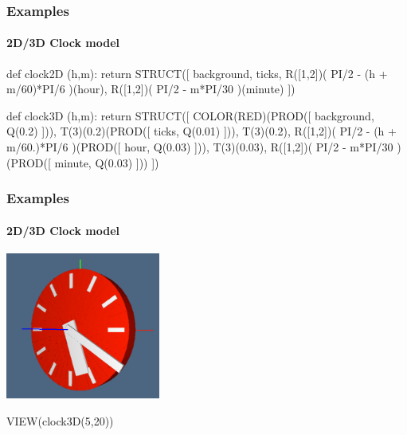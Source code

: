 \documentclass{beamer}
\begin{document}
\begin{frame}[fragile]\frametitle{Examples}
\framesubtitle{2D/3D Clock model}

\vfill


\begin{python}
def clock2D (h,m):
    return STRUCT([ background, ticks,
	    R([1,2])( PI/2 - (h + m/60)*PI/6 )(hour),
	    R([1,2])( PI/2 - m*PI/30 )(minute) ])
\end{python}


\begin{python}
def clock3D (h,m):
    return STRUCT([  
    	COLOR(RED)(PROD([ background, Q(0.2) ])),
    	T(3)(0.2)(PROD([ ticks, Q(0.01) ])), T(3)(0.2),
    	R([1,2])( PI/2 - (h + m/60.)*PI/6 )(PROD([ hour, Q(0.03) ])), T(3)(0.03),
    	R([1,2])( PI/2 - m*PI/30 )(PROD([ minute, Q(0.03) ])) ])
\end{python}

\vfill

\end{frame}
\begin{frame}[fragile]\frametitle{Examples}
\framesubtitle{2D/3D Clock model}

\vfill\centering

   \includegraphics[width=2in]{figs/newclock} 

\begin{python}
VIEW(clock3D(5,20))
\end{python}


\end{frame}
\end{document}
